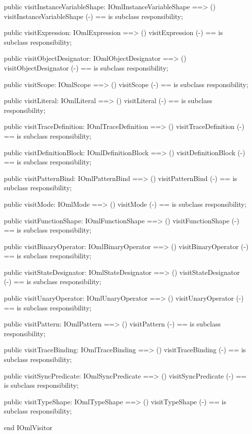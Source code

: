 \begin{vdm_al}
  public visitInstanceVariableShape: IOmlInstanceVariableShape ==> ()
  visitInstanceVariableShape (-) == is subclass responsibility;

  public visitExpression: IOmlExpression ==> ()
  visitExpression (-) == is subclass responsibility;

  public visitObjectDesignator: IOmlObjectDesignator ==> ()
  visitObjectDesignator (-) == is subclass responsibility;

  public visitScope: IOmlScope ==> ()
  visitScope (-) == is subclass responsibility;

  public visitLiteral: IOmlLiteral ==> ()
  visitLiteral (-) == is subclass responsibility;

  public visitTraceDefinition: IOmlTraceDefinition ==> ()
  visitTraceDefinition (-) == is subclass responsibility;

  public visitDefinitionBlock: IOmlDefinitionBlock ==> ()
  visitDefinitionBlock (-) == is subclass responsibility;

  public visitPatternBind: IOmlPatternBind ==> ()
  visitPatternBind (-) == is subclass responsibility;

  public visitMode: IOmlMode ==> ()
  visitMode (-) == is subclass responsibility;

  public visitFunctionShape: IOmlFunctionShape ==> ()
  visitFunctionShape (-) == is subclass responsibility;

  public visitBinaryOperator: IOmlBinaryOperator ==> ()
  visitBinaryOperator (-) == is subclass responsibility;

  public visitStateDesignator: IOmlStateDesignator ==> ()
  visitStateDesignator (-) == is subclass responsibility;

  public visitUnaryOperator: IOmlUnaryOperator ==> ()
  visitUnaryOperator (-) == is subclass responsibility;

  public visitPattern: IOmlPattern ==> ()
  visitPattern (-) == is subclass responsibility;

  public visitTraceBinding: IOmlTraceBinding ==> ()
  visitTraceBinding (-) == is subclass responsibility;

  public visitSyncPredicate: IOmlSyncPredicate ==> ()
  visitSyncPredicate (-) == is subclass responsibility;

  public visitTypeShape: IOmlTypeShape ==> ()
  visitTypeShape (-) == is subclass responsibility;

end IOmlVisitor
\end{vdm_al}

